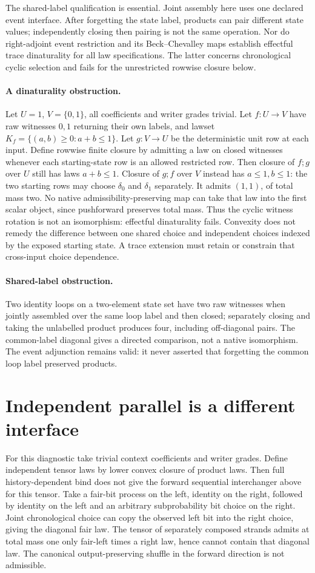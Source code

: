 \documentclass{article}
\begin{document}
The shared-label qualification is essential. Joint assembly here uses one declared event interface. After forgetting the state label, products can pair different state values; independently closing then pairing is not the same operation. Nor do right-adjoint event restriction and its Beck--Chevalley maps establish effectful trace dinaturality for all law specifications. The latter concerns chronological cyclic selection and fails for the unrestricted rowwise closure below.

\paragraph{A dinaturality obstruction.} Let $U=1$, $V=\{0,1\}$, all coefficients and writer grades trivial. Let $f:U\to V$ have raw witnesses $0,1$ returning their own labels, and lawset $K_f=\{(a,b)\ge0:a+b\le1\}$. Let $g:V\to U$ be the deterministic unit row at each input. Define rowwise finite closure by admitting a law on closed witnesses whenever each starting-state row is an allowed restricted row. Then closure of $f;g$ over $U$ still has laws $a+b\le1$. Closure of $g;f$ over $V$ instead has $a\le1,b\le1$: the two starting rows may choose $\delta_0$ and $\delta_1$ separately. It admits $(1,1)$, of total mass two. No native admissibility-preserving map can take that law into the first scalar object, since pushforward preserves total mass. Thus the cyclic witness rotation is not an isomorphism: effectful dinaturality fails. Convexity does not remedy the difference between one shared choice and independent choices indexed by the exposed starting state. A trace extension must retain or constrain that cross-input choice dependence.

\paragraph{Shared-label obstruction.} Two identity loops on a two-element state set have two raw witnesses when jointly assembled over the same loop label and then closed; separately closing and taking the unlabelled product produces four, including off-diagonal pairs. The common-label diagonal gives a directed comparison, not a native isomorphism. The event adjunction remains valid: it never asserted that forgetting the common loop label preserved products.
\section{Independent parallel is a different interface}
For this diagnostic take trivial context coefficients and writer grades. Define independent tensor laws by lower convex closure of product laws. Then full history-dependent bind does not give the forward sequential interchanger above for this tensor. Take a fair-bit process on the left, identity on the right, followed by identity on the left and an arbitrary subprobability bit choice on the right. Joint chronological choice can copy the observed left bit into the right choice, giving the diagonal fair law. The tensor of separately composed strands admits at total mass one only fair-left times a right law, hence cannot contain that diagonal law. The canonical output-preserving shuffle in the forward direction is not admissible.
\end{document}
